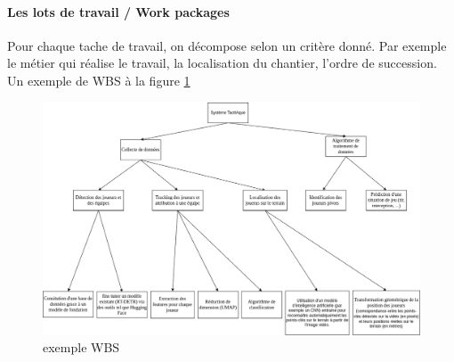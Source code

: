 \paragraph*{Les lots de travail / Work packages}
Pour chaque tache de travail, on décompose selon un critère donné. Par exemple le métier qui réalise le travail, la localisation du chantier, l'ordre de succession.
Un exemple de WBS à la figure \ref{fig:exemple_wbs}
\begin{figure}
	\begin{center}
		\includegraphics[scale=0.6]{images/tactIAque_wbs.png}
		\caption{exemple WBS}
		\label{fig:exemple_wbs}
	\end{center}
\end{figure}
